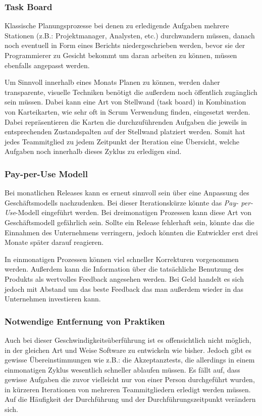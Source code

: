 \subsubsection{Task Board}
\label{minisec:task}
Klassische Planungsprozesse bei denen zu erledigende Aufgaben mehrere
Stationen (z.B.: Projektmanager, Analysten, etc.) durchwandern müssen, danach
noch eventuell in Form eines Berichts niedergeschrieben werden, bevor sie der
Programmierer zu Gesicht bekommt um daran arbeiten zu können, müssen ebenfalls
angepasst werden.

Um Sinnvoll innerhalb eines Monats Planen zu können, werden daher
transparente, visuelle Techniken benötigt die außerdem noch öffentlich
zugänglich sein müssen. Dabei kann eine Art von Stellwand (task board) in
Kombination von Karteikarten, wie sehr oft in Scrum Verwendung finden,
eingesetzt werden. Dabei repräsentieren die Karten die durchzuführenden
Aufgaben die jeweils in entsprechenden Zustandspalten auf der Stellwand
platziert werden. Somit hat jedes Teammitglied zu jedem Zeitpunkt der
Iteration eine Übersicht, welche Aufgaben noch innerhalb dieses Zyklus zu
erledigen sind.

\subsubsection{Pay-per-Use Modell}
\label{minisec:pay-per-use-modell}

Bei monatlichen Releases kann es erneut sinnvoll sein über eine Anpassung des
Geschäftsmodells nachzudenken.  Bei dieser Iterationskürze könnte das \emph{Pay-
per-Use}-Modell eingeführt werden. Bei dreimonatigen Prozessen kann diese Art
von Geschäftsmodell gefährlich sein. Sollte ein Release fehlerhaft sein,
könnte das die Einnahmen des Unternehmens verringern, jedoch könnten die
Entwickler erst drei Monate später darauf reagieren.

In einmonatigen Prozessen können viel schneller Korrekturen vorgenommen
werden. Außerdem kann die Information über die tatsächliche Benutzung des
Produkts als wertvolles Feedback angesehen werden. Bei Geld handelt es sich
jedoch mit Abstand um das beste Feedback das man außerdem wieder in das
Unternehmen investieren kann.

\subsubsection{Notwendige Entfernung von Praktiken}
\label{minisec:monat-entfernte-praktiken}
Auch bei dieser Geschwindigkeitsüberführung ist es offensichtlich nicht
möglich, in der gleichen Art und Weise Software zu entwickeln wie bisher.
Jedoch gibt es gewisse Übereinstimmungen wie z.B.: die Akzeptanztests, die
allerdings in einem einmonatigen Zyklus wesentlich schneller ablaufen müssen.
Es fällt auf, dass  gewisse Aufgaben die zuvor vielleicht nur von einer Person
durchgeführt wurden, in kürzeren Iterationen von mehreren Teammitgliedern
erledigt werden müssen. Auf die Häufigkeit der Durchführung und der
Durchführungszeitpunkt verändern sich.

